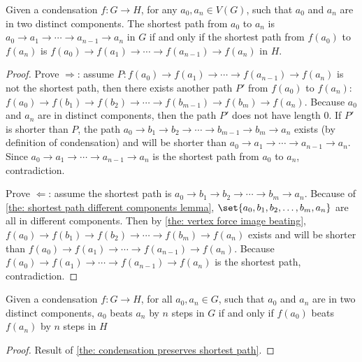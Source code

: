 \begin{theorem}\label{the: condensation preserves shortest path}
  Given a condensation \(f: G \to H\),
  for any \(a_0, a_n \in V(G)\),
  such that \(a_0\) and \(a_n\) are in two distinct components.
  The shortest path from \(a_0\) to \(a_n\) is
  \(a_0 \to a_1 \to \cdots \to a_{n-1} \to a_n\) in \(G\)
  if and only if the shortest path from \(f(a_0)\) to \(f(a_n)\) is
  \(f(a_0) \to f(a_1) \to \cdots \to f(a_{n-1}) \to f(a_n)\)
  in \(H\).
\end{theorem}

\begin{proof}
  Prove \(\Rightarrow \):
  assume \(P: f(a_0) \to f(a_1) \to \cdots \to f(a_{n-1}) \to f(a_n)\)
  is not the shortest path,
  then there exists another path \(P'\)
  from \(f(a_0)\) to \(f(a_n)\): \(f(a_0)
    \to f(b_1) \to f(b_2) \to \cdots \to f(b_{m-1}) \to f(b_m)
    \to f(a_n)\).
  Because \(a_0\) and \(a_n\) are in distinct components,
  then the path \(P'\) does not have length 0.
  If \(P'\) is shorter than \(P\), the path
  \(a_0 \to b_1 \to b_2 \to \cdots \to b_{m-1} \to b_m \to a_n\)
  exists (by definition of condensation) and will be shorter than
  \(a_0 \to a_1 \to \cdots \to a_{n-1} \to a_n\).
  Since \(a_0 \to a_1 \to \cdots \to a_{n-1} \to a_n\)
  is the shortest path from \(a_0\) to \(a_n\),
  contradiction.

  Prove \(\Leftarrow \):
  assume the shortest path is
  \(a_0 \to b_1 \to b_2 \to \cdots \to b_m \to a_n\).
  Because of \cref{the: shortest path different components lemma},
  \(\set{a_0, b_1, b_2, \ldots, b_m, a_n}\)
  are all in different components.
  Then by \cref{the: vertex force image beating},
  \(f(a_0) \to f(b_1) \to f(b_2) \to \cdots \to f(b_m) \to f(a_n)\)
  exists and will be shorter than
  \(f(a_0) \to f(a_1) \to \cdots \to f(a_{n-1}) \to f(a_n)\).
  Because \(f(a_0) \to f(a_1) \to \cdots \to f(a_{n-1}) \to f(a_n)\)
  is the shortest path, contradiction.
\end{proof}

\begin{corollary}\label{the: condensation preserves beating in distinct components}
  Given a condensation \(f: G \to H\),
  for all \(a_0, a_n \in G\),
  such that \(a_0\) and \(a_n\) are in two distinct components,
  \(a_0\) beats \(a_n\) by \(n\) steps in \(G\) if and only if
  \(f(a_0)\) beats \(f(a_n)\) by \(n\) steps in \(H\)
\end{corollary}

\begin{proof}
  Result of \cref{the: condensation preserves shortest path}.
\end{proof}

